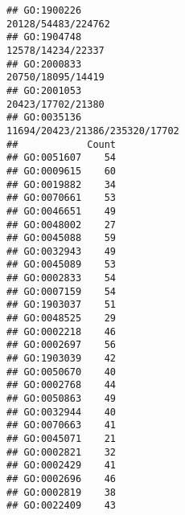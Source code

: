 \documentclass[
]{article}
\begin{document}
\begin{verbatim}
## GO:1900226                                                                                                                                                                                                                                                                                                                                                                                           20128/54483/224762
## GO:1904748                                                                                                                                                                                                                                                                                                                                                                                            12578/14234/22337
## GO:2000833                                                                                                                                                                                                                                                                                                                                                                                            20750/18095/14419
## GO:2001053                                                                                                                                                                                                                                                                                                                                                                                            20423/17702/21380
## GO:0035136                                                                                                                                                                                                                                                                                                                                                                               11694/20423/21386/235320/17702
##            Count
## GO:0051607    54
## GO:0009615    60
## GO:0019882    34
## GO:0070661    53
## GO:0046651    49
## GO:0048002    27
## GO:0045088    59
## GO:0032943    49
## GO:0045089    53
## GO:0002833    54
## GO:0007159    54
## GO:1903037    51
## GO:0048525    29
## GO:0002218    46
## GO:0002697    56
## GO:1903039    42
## GO:0050670    40
## GO:0002768    44
## GO:0050863    49
## GO:0032944    40
## GO:0070663    41
## GO:0045071    21
## GO:0002821    32
## GO:0002429    41
## GO:0002696    46
## GO:0002819    38
## GO:0022409    43

\end{verbatim}
\end{document}
